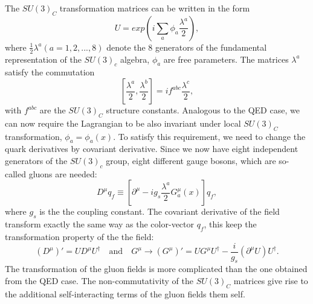 \documentclass{report}
\numberwithin{equation}{section}
\begin{document}
The $SU(3)_C$ transformation matrices can be written in the form
\begin{equation}
U=exp\left( i\sum_a \phi_a\frac{\lambda^a}{2}\right),
\end{equation}
where $\frac{1}{2}\lambda^a (a=1,2,...,8)$ denote the 8 generators of the fundamental representation of the $SU(3)_c$ algebra, $\phi_a$ are free parameters. The matrices $\lambda^a$ satisfy  the commutation 
\begin{equation}
\label{commut}
\left[\frac{\lambda^a}{2},\frac{\lambda^b}{2}\right] = i f^{abc} \frac{\lambda^c}{2},
\end{equation}
with $f^{abc}$ are the $SU(3)_C$ structure constants.
Analogous to the QED case, we can now require the Lagrangian to be also invariant under local $SU(3)_C$ transformation, $\phi_a =\phi_a(x)$. To satisfy this requirement, we need to change the quark derivatives by covariant derivative. Since we now have eight independent generators of the $SU(3)_c$ group, eight different gauge bosons, which are so-called gluons are needed:
\begin{equation}
 D^\mu q_f \equiv \left[\partial^\mu - i g_s\frac{\lambda^a}{2}G^\mu_a(x)\right] q_f,
 \end{equation} 
 where $g_s$ is the the coupling constant.
The covariant derivative of the field transform exactly the same way as the color-vector $q_f$, this keep the transformation property of the the field:
\begin{equation}
(D^\mu)'=U D^\mu U^\dagger \quad \text{and}\quad G^\mu \rightarrow (G^\mu)'= UG^\mu U^\dagger -\frac{i}{g_s}(\partial^\mu U)U^\dagger.
\end{equation}
The transformation of the gluon fields is more complicated than the one obtained from the QED case. The non-commutativity of the $SU(3)_C$ matrices give rise to the additional self-interacting terms of the gluon fields them self.
\end{document}
